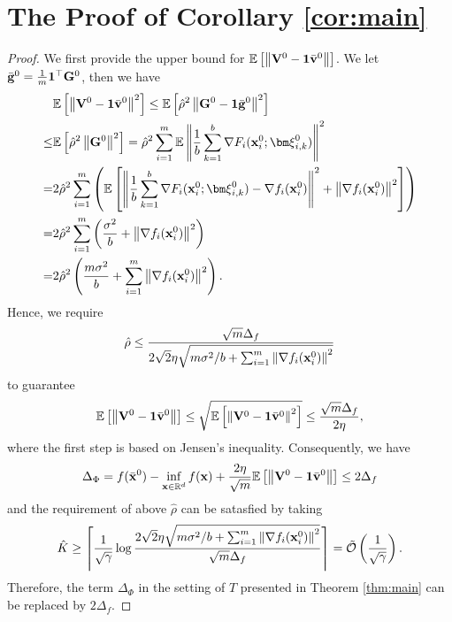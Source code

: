 \documentclass[sigconf]{acmart}
\newcommand{\Norm}[1]{\left\| #1 \right\|}
\def\vone{{\bf{1}}}
\def\vg{{\bf{g}}}
\def\vv{{\bf{v}}}
\def\vx{{\bf{x}}}
\def\fO{{\mathcal{O}}}
\def\BE{{\mathbb{E}}}
\def\BR{{\mathbb{R}}}
\def\mG {{\bf G}}
\def\mV {{\bf V}}
\theoremstyle{plain}
\def\bx{{\bar\vx}}
\def\bg{{\bar\vg}}
\def\bv{{\bar\vv}}
\def\vxi{{\bm\xi}}
\begin{document}
\section{The Proof of Corollary \ref{cor:main}}
\begin{proof}
We first provide the upper bound for $\BE\left[\Norm{\mV^0-\vone\bv^0}\right]$.
We let $\bg^0=\frac{1}{m}\vone^\top\mG^0$, then we have
\begin{align*}
   & \BE\left[\Norm{\mV^0-\vone\bv^0}^2\right] 
\leq  \BE\left[\hat\rho^2\Norm{\mG^0-\vone\bg^0}^2\right]  \\
\leq & \BE\left[\hat\rho^2\Norm{\mG^0}^2\right]  
=   \hat\rho^2\sum_{i=1}^m \BE\Norm{\frac{1}{b}\sum_{k=1}^b \nabla F_i(\vx_i^0;\vxi_{i,k}^0)}^2 \\
=  &  2\hat\rho^2\sum_{i=1}^m \left(\BE\left[\Norm{\frac{1}{b}\sum_{k=1}^b \nabla F_i(\vx_i^0;\vxi_{i,k}^0) - \nabla f_i(\vx_i^0)}^2 + \Norm{\nabla f_i(\vx_i^0)}^2\right]\right) \\
=  &  2\hat\rho^2\sum_{i=1}^m \left(\frac{\sigma^2}{b} + \Norm{\nabla f_i(\vx_i^0)}^2\right) \\
=  &  2\hat\rho^2 \left(\frac{m\sigma^2}{b} + \sum_{i=1}^m\Norm{\nabla f_i(\vx_i^0)}^2\right). 
\end{align*}
Hence, we require
\begin{align*}
    \hat\rho    \leq  \frac{\sqrt{m}\Delta_f}{2\sqrt{2}\eta\sqrt{{m\sigma^2}/{b} + \sum_{i=1}^m\Norm{\nabla f_i(\vx_i^0)}^2}}
\end{align*}
to guarantee
\begin{align}\label{eq:Delta_f}
\BE\left[\Norm{\mV^0-\vone\bv^0}\right]
\leq \sqrt{\BE\left[\Norm{\mV^0-\vone\bv^0}^2\right]}
\leq \frac{\sqrt{m}\Delta_f}{2\eta},
\end{align}
where the first step is based on Jensen's inequality.
Consequently, we have
\begin{align*}
\Delta_{\Phi} = f(\bx^0) - \inf_{\vx\in\BR^d} f(\vx) + \frac{2\eta}{\sqrt{m}}\BE\left[\Norm{\mV^0-\vone\bv^0}\right] \leq  2\Delta_f
\end{align*}
and the requirement of above $\hat\rho$ can be satasfied by taking
\begin{align*}
\hat K \geq \left\lceil\frac{1}{\sqrt{\gamma}}\log\frac{2\sqrt{2}\eta\sqrt{{m\sigma^2}/{b} + \sum_{i=1}^m\Norm{\nabla f_i(\vx_i^0)}^2}}{\sqrt{m}\Delta_f}\right\rceil
= \tilde\fO\left(\frac{1}{\sqrt{\gamma}}\right).
\end{align*}
Therefore, the term $\Delta_{\Phi}$ in the setting of $T$ presented in Theorem \ref{thm:main} can be replaced by $2\Delta_f$.


\end{proof}
\end{document}
